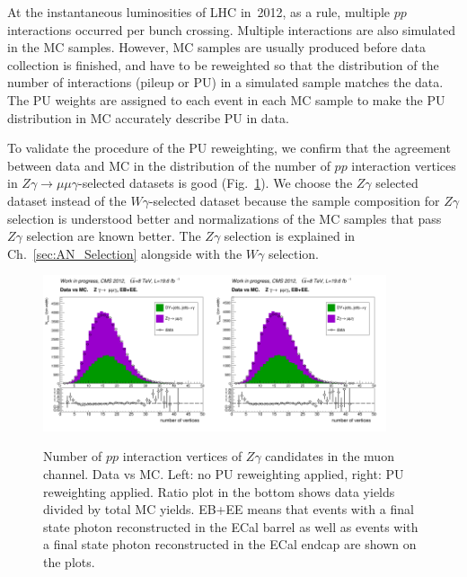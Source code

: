 At the instantaneous luminosities of LHC in~2012, as a rule, multiple $pp$ interactions occurred per bunch crossing. Multiple interactions are also simulated in the MC samples. However, MC samples are usually produced before data collection is finished, and have to be reweighted so that the distribution of the number of interactions (pileup or PU) in a simulated sample matches the data. The PU weights are assigned to each event in each MC sample to make the PU distribution in MC accurately describe PU in data.

To validate the procedure of the PU reweighting, we confirm that the agreement between data and MC in the distribution of the number of $pp$ interaction vertices in $Z\gamma\rightarrow\mu\mu\gamma$-selected datasets is good (Fig.~\ref{fig:DATAvsMC_nVtx}). We choose the $Z\gamma$ selected dataset instead of the $W\gamma$-selected dataset because the sample composition for $Z\gamma$ selection is understood better and normalizations of the MC samples that pass $Z\gamma$ selection are known better. The $Z\gamma$ selection is explained in Ch.~\ref{sec:AN_Selection} alongside with the $W\gamma$ selection.

\begin{figure}[htb]
  \begin{center}
   \includegraphics[width=0.45\textwidth]{../figs/figs_v11/MUON_ZGamma/PrepareYields/c_TotalDATAvsMC_EtaCommon__nVtx_noPU.png}\includegraphics[width=0.45\textwidth]{../figs/figs_v11/MUON_ZGamma/PrepareYields/c_TotalDATAvsMC_EtaCommon__nVtx.png}
  \caption{Number of $pp$ interaction vertices of $Z\gamma$ candidates in the muon channel. Data vs MC. Left: no PU reweighting applied, right: PU reweighting applied. Ratio plot in the bottom shows data yields divided by total MC yields. EB+EE means that events with a final state photon reconstructed in the ECal barrel as well as  events with a final state photon reconstructed in the ECal endcap are shown on the plots.}
  \label{fig:DATAvsMC_nVtx}
  \end{center}
\end{figure}

